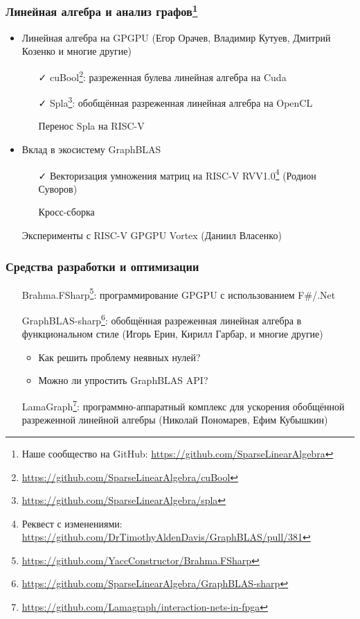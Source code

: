 \documentclass[xcolor=table,aspectratio=169]{beamer}
\begin{document}
\begin{frame}[fragile]
  \frametitle{Линейная алгебра и анализ графов\footnote{Наше сообщество на GitHub: \url{https://github.com/SparseLinearAlgebra}}}
  \begin{itemize}
    \item Линейная алгебра на GPGPU (Егор Орачев, Владимир Кутуев, Дмитрий Козенко и многие другие)
    \begin{itemize}
      \item[\faCheck] cuBool\footnote{\url{https://github.com/SparseLinearAlgebra/cuBool}}: разреженная булева линейная алгебра на Cuda
      \item[\faCheck] Spla\footnote{\url{https://github.com/SparseLinearAlgebra/spla}}: обобщённая разреженная линейная алгебра на OpenCL
      \item[\faGears] Перенос Spla на RISC-V
    \end{itemize}
    \item Вклад в экосистему GraphBLAS
    \begin{itemize}
      \item[\faCheck] Векторизация умножения матриц на RISC-V RVV1.0\footnote{Реквест с изменениями: \url{https://github.com/DrTimothyAldenDavis/GraphBLAS/pull/381}} (Родион Суворов) 
      \item[\faGears] Кросс-сборка
    \end{itemize}
    \item[\faGears] Эксперименты с RISC-V GPGPU Vortex (Даниил Власенко)
  \end{itemize}
\end{frame}

\begin{frame}[fragile]
  \frametitle{Средства разработки и оптимизации}
  \begin{itemize}
    \item[\faGears] Brahma.FSharp\footnote{\url{https://github.com/YaccConstructor/Brahma.FSharp}}: программирование GPGPU с использованием F\#/.Net
    \item[\faGears] GraphBLAS-sharp\footnote{\url{https://github.com/SparseLinearAlgebra/GraphBLAS-sharp}}: обобщённая разреженная линейная алгебра в функциональном стиле (Игорь Ерин, Кирилл Гарбар, и многие другие)
    \begin{itemize}
      \item Как решить проблему неявных нулей?
      \item Можно ли упростить GraphBLAS API?
    \end{itemize}
    \item[\faGears] LamaGraph\footnote{\url{https://github.com/Lamagraph/interaction-nets-in-fpga}}: программно-аппаратный комплекс для ускорения обобщённой разреженной линейной алгебры (Николай Пономарев, Ефим Кубышкин)
  \end{itemize}
  
\end{frame}
\end{document}
